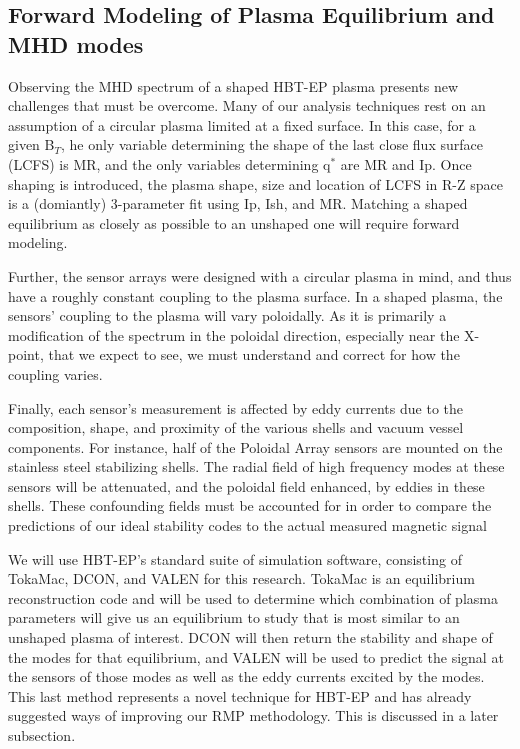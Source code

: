 \documentclass[aps,preprint,showpacs,superscriptaddress,groupedaddress]{revtex4}  %
\begin{document}
\subsection{Forward Modeling of Plasma Equilibrium and MHD modes}
	Observing the MHD spectrum of a shaped HBT-EP plasma presents new challenges that must be overcome.  Many of our analysis techniques rest on an assumption of a circular plasma limited at a fixed surface.  In this case, for a given B$_T$, he only variable determining the shape of the last close flux surface (LCFS) is MR, and the only variables determining  q$^*$ are MR and Ip. Once shaping is introduced, the plasma shape, size and location of LCFS in R-Z space is a (domiantly) 3-parameter fit using Ip, Ish, and MR.  Matching a shaped equilibrium as closely as possible to an unshaped one will require forward modeling.\par
	Further, the sensor arrays were designed with a circular plasma in mind, and thus have a roughly constant coupling to the plasma surface.  In a shaped plasma, the sensors' coupling to the plasma will vary poloidally.  As it is primarily a modification of the spectrum in the poloidal direction, especially near the X-point, that we expect to see, we must understand and correct for how the coupling varies.\par
	Finally, each sensor's measurement is affected by eddy currents due to the composition, shape, and proximity of the various shells and vacuum vessel components.  For instance, half of the Poloidal Array sensors are mounted on the stainless steel stabilizing shells.  The radial field of high frequency modes at these sensors will be attenuated, and the poloidal field enhanced, by eddies in these shells.  These confounding fields must be accounted for in order to compare the predictions of our ideal stability codes to the actual measured magnetic signal\par
	We will use HBT-EP's standard suite of simulation software, consisting of TokaMac, DCON, and VALEN for this research.  TokaMac is an equilibrium reconstruction code and will be used to determine which combination of plasma parameters will give us an equilibrium to study that is most similar to an unshaped plasma of interest.  DCON will then return the stability and shape of the modes for that equilibrium, and VALEN will be used to predict the signal at the sensors of those modes as well as the eddy currents excited by the modes.  This last method represents a novel technique for HBT-EP and has already suggested ways of improving our RMP methodology.  This is discussed in a later subsection.
\end{document}
